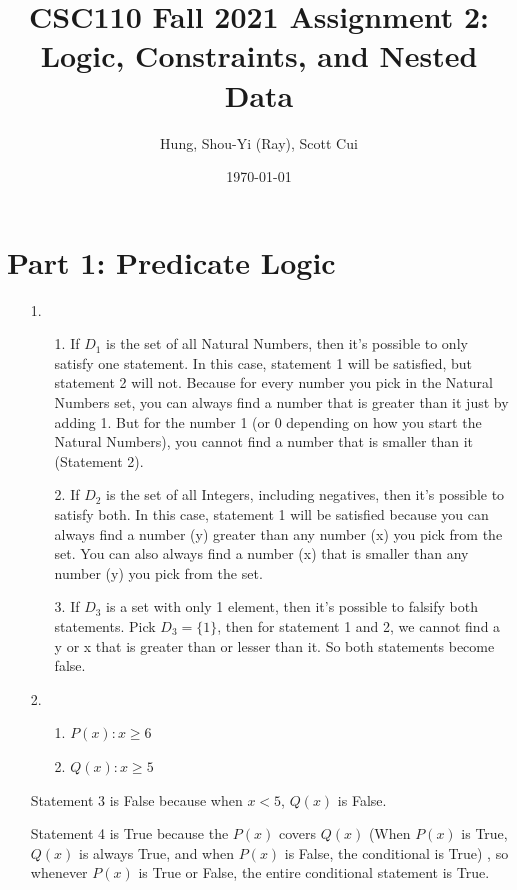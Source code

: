 \documentclass[fontsize=11pt]{article}
\title{CSC110 Fall 2021 Assignment 2: Logic, Constraints, and Nested Data}
\author{Hung, Shou-Yi (Ray), Scott Cui}
\date{\today}
\begin{document}
\maketitle

\section*{Part 1: Predicate Logic}

\begin{enumerate}

    \item[1.]
        \begin{enumerate}
            \item[1.] If $D_1$ is the set of all Natural Numbers, then it's possible to only satisfy one statement. In this case, statement 1 will be satisfied, but statement 2 will not. Because for every number you pick in the Natural Numbers set, you can always find a number that is greater than it just by adding 1. But for the number 1 (or 0 depending on how you start the Natural Numbers), you cannot find a number that is smaller than it (Statement 2).
            \item[2.] If $D_2$ is the set of all Integers, including negatives, then it's possible to satisfy both. In this case, statement 1 will be satisfied because you can always find a number (y) greater than any number (x) you pick from the set. You can also always find a number (x) that is smaller than any number (y) you pick from the set.
            \item[3.] If $D_3$ is a set with only 1 element, then it's possible to falsify both statements. Pick $D_3 = \{1\}$, then for statement 1 and 2, we cannot find a y or x that is greater than or lesser than it. So both statements become false.
        \end{enumerate}

    \item[2.]
        \begin{enumerate}
            \item[1.] $P(x): x \ge 6$
            \item[2.] $Q(x): x \ge 5$
        \end{enumerate}
            Statement 3 is False because when $x < 5$, $Q(x)$ is False.

            Statement 4 is True because the $P(x)$ covers $Q(x)$
            (When $P(x)$ is True, $Q(x)$ is always True, and when $P(x)$ is False, the conditional is True)
            , so whenever $P(x)$ is True or False, the entire conditional statement is True.


\end{enumerate}
\end{document}
